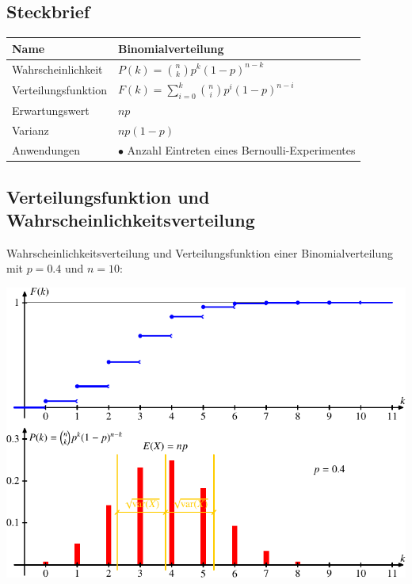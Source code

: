 %
%
%
\subsection{Steckbrief}
\begin{center}
\renewcommand{\arraystretch}{1.5}
\begin{tabular}{|l|l|}
\hline
Name&Binomialverteilung\\
\hline
Wahrscheinlichkeit&
\begin{minipage}{3.7in}
\vskip3pt
$\displaystyle P(k)=\binom{n}{k}p^k(1-p)^{n-k}$
\end{minipage}
\\[10pt]
Verteilungsfunktion&
$\displaystyle F(k)=\sum_{i=0}^k\binom{n}{i}p^i(1-p)^{n-i}$
\\[10pt]
Erwartungswert&$\displaystyle np$\\
Varianz&$\displaystyle np(1-p)$\\
\hline
Anwendungen&\begin{minipage}{3.7in}%
\strut
$\bullet$ Anzahl Eintreten eines Bernoulli-Experimentes
\strut
\end{minipage}\\
\hline
\end{tabular}
\end{center}

\subsection{Verteilungsfunktion und Wahrscheinlichkeitsverteilung}
Wahrscheinlichkeitsverteilung und Verteilungsfunktion einer
Binomialverteilung mit $p=0.4$ und $n=10$:
\begin{center}
\includegraphics{images/gl-3.pdf}
\end{center}


